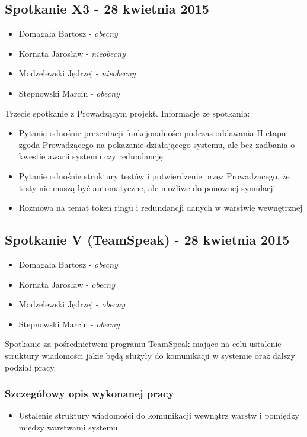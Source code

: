 \subsection[Spotkanie X3 - 28 kwietnia 2015]{Spotkanie X3 - 28 kwietnia 2015}

\begin{itemize}
\item Domagała Bartosz - \textit{obecny}
\item Kornata Jarosław - \textit{nieobecny}
\item Modzelewski Jędrzej - \textit{nieobecny}
\item Stepnowski Marcin - \textit{obecny}
\end{itemize}

\par{Trzecie spotkanie z Prowadzącym projekt. Informacje ze spotkania:}

\begin{itemize}
\item Pytanie odnośnie prezentacji funkcjonalności podczas oddawania II etapu - zgoda Prowadzącego na pokazanie działającego systemu, ale bez zadbania o kwestie awarii systemu czy redundancję
\item Pytanie odnośnie struktury testów i potwierdzenie przez Prowadzącego, że testy nie muszą być automatyczne, ale możliwe do ponownej symulacji
\item Rozmowa na temat token ringu i redundancji danych w warstwie wewnętrznej

\end{itemize}

\subsection[Spotkanie V - 28 kwietnia 2015]{Spotkanie V (TeamSpeak) - 28 kwietnia 2015}

\begin{itemize}
\item Domagała Bartosz - \textit{obecny}
\item Kornata Jarosław - \textit{obecny}
\item Modzelewski Jędrzej - \textit{obecny}
\item Stepnowski Marcin - \textit{obecny}
\end{itemize}

\par{Spotkanie za pośrednictwem programu TeamSpeak mające na celu ustalenie struktury wiadomości jakie będą służyły do komunikacji w systemie oraz dalszy podział pracy.}

\subsubsection*[Szczegółowy opis wykonanej pracy]{Szczegółowy opis wykonanej pracy}
\begin{itemize}
\item Ustalenie struktury wiadomości do komunikacji wewnątrz warstw i pomiędzy między warstwami systemu

\end{itemize}